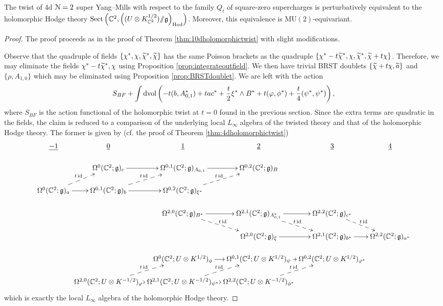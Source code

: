 \documentclass[10pt, oneside]{article}
\newcommand{\Hod}{\mathrm{Hod}}
\newcommand{\MU}{\mathrm{MU}}
\newcommand{\Sect}{\mathrm{Sect}}
\newcommand{\ham}{/\!\!/}
\begin{document}
\begin{theorem}
The twist of 4d $\mathcal N=2$ super Yang--Mills with respect to the family $Q_t$ of square-zero supercharges is perturbatively equivalent to the holomorphic Hodge theory $\Sect\left(\CC^2, \left((U\otimes K_{\CC^2}^{1/2})\ham \fg\right)_{\Hod}\right)$. Moreover, this equivalence is $\MU(2)$-equivariant.
\label{thm:4dDonaldsontwist}
\end{theorem}
\begin{proof}
The proof proceeds as in the proof of Theorem \ref{thm:10dholomorphictwist} with slight modifications.

Observe that the quadruple of fields $\{\chi^*, \chi, \widetilde{\chi}^*, \widetilde{\chi}\}$ has the same Poisson brackets as the quadruple $\{\chi^*-t\widetilde{\chi}^*, \chi, \widetilde{\chi}^*, \widetilde{\chi} + t\chi\}$. Therefore, we may eliminate the fields $\chi^*-t\widetilde{\chi}^*, \chi$ using Proposition \ref{prop:integrateoutfield}. We then have trivial BRST doublets $\{\widetilde{\chi} + t\chi, \widetilde{a}\}$ and $\{\rho, A_{1, 0}\}$ which may be eliminated using Proposition \ref{prop:BRSTdoublet}. We are left with the action
\[S_{BF} + \int\operatorname{dvol}\left(-t(b, A_{0, 1}^*) + t a c^* + \frac{t}{2} \xi^*\wedge B^* + t (\varphi, \phi^*) + \frac t4 (\psi^*, \psi^*) \right),\]
where $S_{BF}$ is the action functional of the holomorphic twist at $t=0$ found in the previous section. 
Since the extra terms are quadratic in the fields, the claim is reduced to a comparison of the underlying local $L_\infty$ algebra of the twisted theory and that of the holomorphic Hodge theory. The former is given by (cf. the proof of Theorem \ref{thm:4dholomorphictwist})
\[
\xymatrix@R=0.5cm@C=0cm{
\ul{-1} & \ul{0} & \ul{1} & \ul{2} & \ul{3} & \ul{4} \\ 
& \Omega^0(\CC^2; \gg)_c \ar[r] &\Omega^{0,1}(\CC^2; \gg)_{A_{0,1}} \ar[r] &\Omega^{0,2}(\CC^2; \gg)_{B} \\
\Omega^0(\CC^2; \gg)_a  \ar@{-->}^{t\id}[ur] \ar[r] &\Omega^{0,1}(\CC^2; \gg)_{b}  \ar@{-->}^{t\id}[ur] \ar[r] &\Omega^{0,2}(\CC^2; \gg)_{\xi^*}  \ar@{-->}^{t\id}[ur] \\
& &  \Omega^{2,0}(\CC^2 ; \gg)_{B^*}  \ar@{-->}^{t\id}[dr] \ar[r] & \Omega^{2,1}(\CC^2 ; \gg)_{A_{0,1}^*} \ar[r]  \ar@{-->}^{t\id}[dr] & \Omega^{2,2}(\CC^2 ; \gg)_{c^*}  \ar@{-->}^{t\id}[dr] \\
& & & \Omega^{2,0}(\CC^2; \gg)_\xi \ar[r] &\Omega^{2,1}(\CC^2; \gg)_{b^*} \ar[r] &\Omega^{2,2}(\CC^2; \gg)_{a^*}  \\
& & \Omega^0(\CC^2 ; U\otimes K^{1/2})_\phi \ar[r] & \Omega^{0,1}(\CC^2 ; U\otimes K^{1/2})_\psi \ar[r] & \Omega^{0,2}(\CC^2 ; U\otimes K^{1/2})_{\varphi^*} \\
& \Omega^{2,0}(\CC^2 ; U\otimes K^{-1/2})_{\varphi} \ar[r]  \ar@{-->}^{t\id}[ur] & \Omega^{2,1}(\CC^2 ; U\otimes K^{-1/2})_{\psi^*} \ar[r]  \ar@{-->}^{t\id}[ur]  & \Omega^{2,2}(\CC^2 ; U\otimes K^{-1/2})_{\phi^*}  \ar@{-->}^{t\id}[ur]
}
\]
which is exactly the local $L_\infty$ algebra of the holomorphic Hodge theory.
\end{proof}
\end{document}
